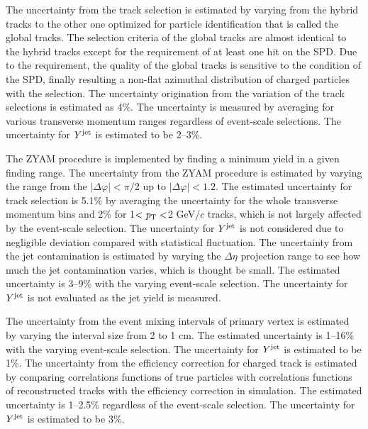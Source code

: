 The uncertainty from the track selection is estimated by varying from the hybrid tracks to the other one optimized for particle identification that is called the global tracks. The selection criteria of the global tracks are almost identical to the hybrid tracks except for the requirement of at least one hit on the SPD. Due to the requirement, the quality of the global tracks is sensitive to the condition of the SPD, finally resulting a non-flat azimuthal distribution of charged particles with the selection. 
The uncertainty origination from the variation of the track selections is estimated as 4\%. The uncertainty is measured by averaging for various transverse momentum ranges regardless of event-scale selections. The uncertainty for $Y^{\rm{jet}}$ is estimated to be 2--3\%.

The ZYAM procedure is implemented by finding a minimum yield in a given finding range. The uncertainty from the ZYAM procedure is estimated by varying the range from the $|\Delta\varphi|<\pi/$2 up to $|\Delta\varphi|<1.2$. The estimated uncertainty for track selection is 5.1\% by averaging the uncertainty for the whole transverse momentum bins and 2\% for 1$<\it{p}_{\rm{T}}<$2 GeV/$c$ tracks, which is not largely affected by the event-scale selection. The uncertainty for $Y^{\rm{jet}}$ is not considered due to negligible deviation compared with statistical fluctuation. The uncertainty from the jet contamination is estimated by varying the $\Delta\eta$ projection range to see how much the jet contamination varies, which is thought be small. The estimated uncertainty is 3--9\% with the varying event-scale selection. The uncertainty for $Y^{\rm{jet}}$ is not evaluated as the jet yield is measured.

The uncertainty from the event mixing intervals of primary vertex is estimated by varying the interval size from 2 to 1 cm. The estimated uncertainty is 1--16\% with the varying event-scale selection. The uncertainty for $Y^{\rm{jet}}$ is estimated to be 1\%. The uncertainty from the efficiency correction for charged track is estimated by comparing correlations functions of true particles with correlations functions of reconstructed tracks with the efficiency correction in simulation. The estimated uncertainty is 1--2.5\% regardless of the event-scale selection. The uncertainty for $Y^{\rm{jet}}$ is estimated to be 3\%.

